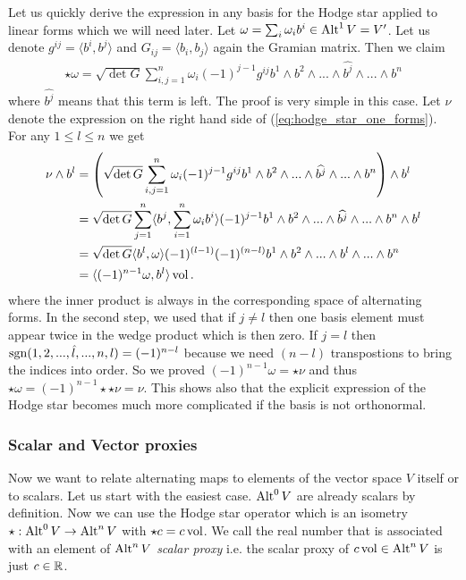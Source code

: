 \documentclass[../master_thesis.tex]{subfiles}
\begin{document}
Let us quickly derive the expression in any basis 
for the Hodge star applied to linear 
forms which we will need later. Let $\omega = \sum_i \omega_i b^i \in 
{\text{Alt}^{1}\,V} = V'$. Let us denote $g^{ij} = \langle b^i, b^j \rangle$ 
and $G_{ij} = \langle b_i, b_j \rangle$ again the Gramian matrix.
Then we claim
\begin{align}
    \star \omega = \sqrt{\det G} \sum_{i,j=1}^n \omega_i (-1)^{j-1} 
        g^{ij} b^1 \wedge
        b^2 \wedge ... \wedge \widehat{b^j}\wedge ... \wedge b^n 
        \label{eq:hodge_star_one_forms}
\end{align}
where $\widehat{b^j}$ means that this term is left. The proof is very 
simple in this case. Let $\nu$ denote the expression on the right hand side 
of (\ref{eq:hodge_star_one_forms}).
For any $1 \leq l \leq n$ we get
\begin{align*}
    \nu \wedge b^l &= \left( \sqrt{\det G} \sum_{i,j=1}^n \omega_i (-1)^{j-1} g^{ij} b^1 \wedge
        b^2 \wedge ... \wedge \widehat{b^j} \wedge ... \wedge b^n\right) \wedge b^l 
    \\ &= \sqrt{\det G} \sum_{j=1}^n \langle b^j,\sum_{i=1}^n \omega_i  b^i\rangle
        (-1)^{j-1}  b^1 \wedge
        b^2 \wedge ... \wedge \widehat{b^j} \wedge ... \wedge b^n \wedge b^l
    \\ &= \sqrt{\det G} \langle b^l,\omega \rangle
        (-1)^{(l-1)}(-1)^{(n-l)}  b^1 \wedge
        b^2 \wedge ... \wedge b^l  \wedge ... \wedge b^n 
    \\ &= \langle (-1)^{n-1}\omega, b^l \rangle \operatorname{vol}.
\end{align*}
where the inner product is always in the corresponding space of alternating forms.
In the second step, we used that if $j\neq l$ then one basis element must 
appear twice in the wedge product which is then zero. If $j=l$ then 
$\operatorname{sgn} (1,2, ..., \hat{l},...,n,l) = (-1)^{n-l}$ because we need $(n-l)$
transpostions to bring the indices into order. So we proved 
$(-1)^{n-1}\omega = \star \nu$ and thus $\star \omega = (-1)^{n-1} \star\star\nu = \nu$.
This shows also that the explicit expression of the Hodge star becomes much more 
complicated if the basis is not orthonormal.


\subsubsection{Scalar and Vector proxies} \label{sec:scalar_and_vector_proxies}
Now we want to relate alternating maps to elements of the 
vector space $V$ itself or to scalars. Let us start with the easiest 
case. ${\text{Alt}^{0}\,V}$ are already scalars by definition. Now we can use 
the Hodge star operator which is an isometry 
$\star: {\text{Alt}^{0}\,V} \rightarrow {\text{Alt}^{n}\,V}$ with
$\star c = c \operatorname{vol}$. 
We call the real number that is associated with an element of 
${\text{Alt}^{n}\,V}$ \textit{scalar proxy} i.e. the scalar proxy of $c \operatorname{vol} \in {\text{Alt}^{n}\,V}$
 is just $c \in \mathbb{R}$.
\end{document}

